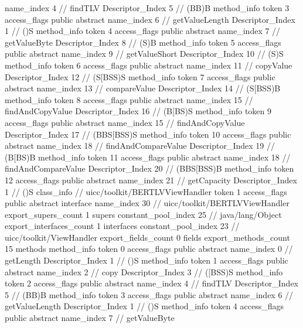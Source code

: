{{{{{					name_index	4		// findTLV
					Descriptor_Index	5		// (BB)B
				}
				method_info {
					token	3
					access_flags	public abstract
					name_index	6		// getValueLength
					Descriptor_Index	1		// ()S
				}
				method_info {
					token	4
					access_flags	public abstract
					name_index	7		// getValueByte
					Descriptor_Index	8		// (S)B
				}
				method_info {
					token	5
					access_flags	public abstract
					name_index	9		// getValueShort
					Descriptor_Index	10		// (S)S
				}
				method_info {
					token	6
					access_flags	public abstract
					name_index	11		// copyValue
					Descriptor_Index	12		// (S[BSS)S
				}
				method_info {
					token	7
					access_flags	public abstract
					name_index	13		// compareValue
					Descriptor_Index	14		// (S[BSS)B
				}
				method_info {
					token	8
					access_flags	public abstract
					name_index	15		// findAndCopyValue
					Descriptor_Index	16		// (B[BS)S
				}
				method_info {
					token	9
					access_flags	public abstract
					name_index	15		// findAndCopyValue
					Descriptor_Index	17		// (BBS[BSS)S
				}
				method_info {
					token	10
					access_flags	public abstract
					name_index	18		// findAndCompareValue
					Descriptor_Index	19		// (B[BS)B
				}
				method_info {
					token	11
					access_flags	public abstract
					name_index	18		// findAndCompareValue
					Descriptor_Index	20		// (BBS[BSS)B
				}
				method_info {
					token	12
					access_flags	public abstract
					name_index	21		// getCapacity
					Descriptor_Index	1		// ()S
				}
			}
		}
		class_info {		// uicc/toolkit/BERTLVViewHandler
			token	1
			access_flags	public abstract interface
			name_index	30		// uicc/toolkit/BERTLVViewHandler
			export_supers_count	1
			supers {
				constant_pool_index	25		// java/lang/Object
			}
			export_interfaces_count	1
			interfaces {
				constant_pool_index	23		// uicc/toolkit/ViewHandler
			}
			export_fields_count	0
			fields {
			}
			export_methods_count	15
			methods {
				method_info {
					token	0
					access_flags	public abstract
					name_index	0		// getLength
					Descriptor_Index	1		// ()S
				}
				method_info {
					token	1
					access_flags	public abstract
					name_index	2		// copy
					Descriptor_Index	3		// ([BSS)S
				}
				method_info {
					token	2
					access_flags	public abstract
					name_index	4		// findTLV
					Descriptor_Index	5		// (BB)B
				}
				method_info {
					token	3
					access_flags	public abstract
					name_index	6		// getValueLength
					Descriptor_Index	1		// ()S
				}
				method_info {
					token	4
					access_flags	public abstract
					name_index	7		// getValueByte
}}}}}
